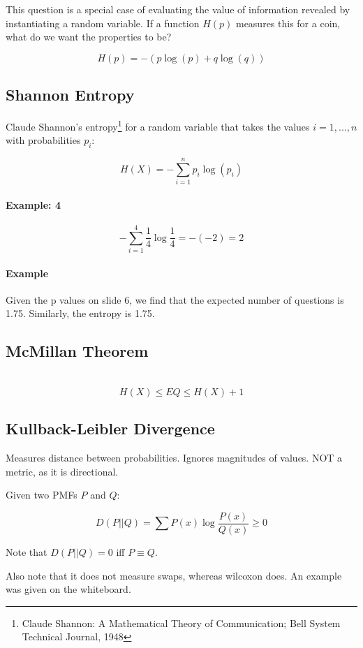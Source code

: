 \documentclass[a4paper]{article}
\begin{document}
This question is a special case of evaluating the value of information revealed by instantiating a random variable.
If a function $H(p)$ measures this for a coin, what do we want the properties to be?

\[H(p) = -(p \log(p) + q \log(q))\]

\subsection{Shannon Entropy}
Claude Shannon's entropy\footnote{Claude Shannon: A Mathematical Theory of Communication; Bell System Technical Journal, 1948} for a random variable that takes the values $i=1,...,n$ with probabilities $p_i$:

\[H(X) = - \sum_{i=1}^n p_i \log(p_i) \]

\paragraph{Example: 4}

\[-\sum_{i=1}^4 \frac{1}{4} \log \frac{1}{4} = - (-2) = 2\]

\paragraph{Example}

Given the p values on slide 6, we find that the expected number of questions is 1.75. Similarly, the entropy is 1.75.

\subsection{McMillan Theorem}\ \\
\[H(X) \le EQ \le H(X) + 1\]

\subsection{Kullback-Leibler Divergence}
Measures distance between probabilities.
Ignores magnitudes of values.
NOT a metric, as it is directional.

Given two PMFs $P$ and $Q$:

\[D(P || Q) = \sum P(x) \log \frac{P(x)}{Q(x)} \ge 0\]

Note that $D(P || Q) = 0$ iff $P \equiv Q$.

Also note that it does not measure swaps, whereas wilcoxon does. An example was given on the whiteboard.
\end{document}
